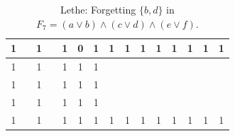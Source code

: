 \begin{table}[!tb]
\begin{tabular}{|c|c|c|c|c|c|c|c|c|c|c|c|c|c|c|}
        \rowcolor{yellow!40} 1 &  & 1 &  & 1 & 0 & 1 & 1 & 1 & 1 & 1 & 1 & 1 & 1 & 1 \\ \hline
        \rowcolor{gray!40} 1 &  & 1 &  & 1 & 1 & 1 &  &  &  &  &  &  &  &  \\ \hline
        \rowcolor{gray!40} 1 &  & 1 &  & 1 & 1 & 1 &  &  &  &  &  &  &  &  \\ \hline
        \rowcolor{gray!40} 1 &  & 1 &  & 1 & 1 & 1 &  &  &  &  &  &  &  &  \\ \hline
        \rowcolor{gray!40} 1 &  & 1 &  & 1 & 1 & 1 & 1 & 1 & 1 & 1 & 1 & 1 & 1 & 1 \\ \hline
    \end{tabular}
    \caption{Lethe: Forgetting $\{b, d\}$ in $F_{7} = (a \lor b) \land (c \lor d) \land (e \lor f)$.}
    \label{tab:lethe-F7-bd}
\end{table}
